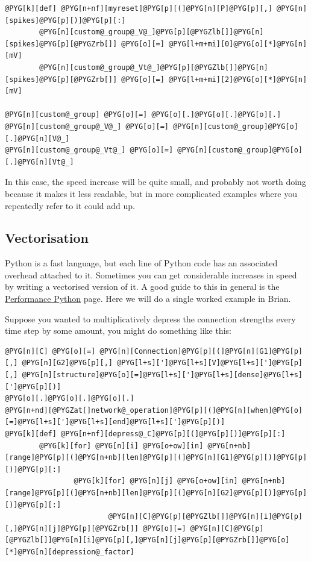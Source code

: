 \documentclass[letterpaper,10pt,english]{manual}
\begin{document}
\begin{Verbatim}[commandchars=@\[\]]
@PYG[k][def] @PYG[n+nf][myreset]@PYG[p][(]@PYG[n][P]@PYG[p][,] @PYG[n][spikes]@PYG[p][)]@PYG[p][:]
        @PYG[n][custom@_group@_V@_]@PYG[p][@PYGZlb[]]@PYG[n][spikes]@PYG[p][@PYGZrb[]] @PYG[o][=] @PYG[l+m+mi][0]@PYG[o][*]@PYG[n][mV]
        @PYG[n][custom@_group@_Vt@_]@PYG[p][@PYGZlb[]]@PYG[n][spikes]@PYG[p][@PYGZrb[]] @PYG[o][=] @PYG[l+m+mi][2]@PYG[o][*]@PYG[n][mV]

@PYG[n][custom@_group] @PYG[o][=] @PYG[o][.]@PYG[o][.]@PYG[o][.]
@PYG[n][custom@_group@_V@_] @PYG[o][=] @PYG[n][custom@_group]@PYG[o][.]@PYG[n][V@_]
@PYG[n][custom@_group@_Vt@_] @PYG[o][=] @PYG[n][custom@_group]@PYG[o][.]@PYG[n][Vt@_]
\end{Verbatim}

In this case, the speed increase will be quite small, and probably
not worth doing because it makes it less readable, but in more
complicated examples where you repeatedly refer to 
it could add up.
\hypertarget{efficiency-vectorisation}{}

\subsection{Vectorisation}

Python is a fast language, but each line of Python code has an
associated overhead attached to it. Sometimes you can get considerable
increases in speed by writing a vectorised version of it. A good guide
to this in general is the \href{http://www.scipy.org/PerformancePython}{Performance Python}
page. Here we will do a single worked example in Brian.

Suppose you wanted to multiplicatively depress the connection
strengths every time step by some amount, you might do something like
this:

\begin{Verbatim}[commandchars=@\[\]]
@PYG[n][C] @PYG[o][=] @PYG[n][Connection]@PYG[p][(]@PYG[n][G1]@PYG[p][,] @PYG[n][G2]@PYG[p][,] @PYG[l+s][']@PYG[l+s][V]@PYG[l+s][']@PYG[p][,] @PYG[n][structure]@PYG[o][=]@PYG[l+s][']@PYG[l+s][dense]@PYG[l+s][']@PYG[p][)]
@PYG[o][.]@PYG[o][.]@PYG[o][.]
@PYG[n+nd][@PYGZat[]network@_operation]@PYG[p][(]@PYG[n][when]@PYG[o][=]@PYG[l+s][']@PYG[l+s][end]@PYG[l+s][']@PYG[p][)]
@PYG[k][def] @PYG[n+nf][depress@_C]@PYG[p][(]@PYG[p][)]@PYG[p][:]
        @PYG[k][for] @PYG[n][i] @PYG[o+ow][in] @PYG[n+nb][range]@PYG[p][(]@PYG[n+nb][len]@PYG[p][(]@PYG[n][G1]@PYG[p][)]@PYG[p][)]@PYG[p][:]
                @PYG[k][for] @PYG[n][j] @PYG[o+ow][in] @PYG[n+nb][range]@PYG[p][(]@PYG[n+nb][len]@PYG[p][(]@PYG[n][G2]@PYG[p][)]@PYG[p][)]@PYG[p][:]
                        @PYG[n][C]@PYG[p][@PYGZlb[]]@PYG[n][i]@PYG[p][,]@PYG[n][j]@PYG[p][@PYGZrb[]] @PYG[o][=] @PYG[n][C]@PYG[p][@PYGZlb[]]@PYG[n][i]@PYG[p][,]@PYG[n][j]@PYG[p][@PYGZrb[]]@PYG[o][*]@PYG[n][depression@_factor]
\end{Verbatim}
\end{document}
